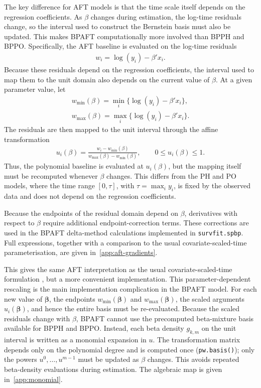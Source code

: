 \documentclass[5p,lefttitle]{elsarticle}
\begin{document}
{The key difference for AFT models is that the time scale itself depends on the regression coefficients. As \(\beta\) changes during estimation, the log-time residuals change, so the interval used to construct the Bernstein basis must also be updated. This makes BPAFT computationally more involved than BPPH and BPPO.
Specifically, the AFT baseline is evaluated on the log-time residuals
{\begin{align}
w_i = \log(y_i)-\beta'x_i .
\end{align}\normalsize}
Because these residuals depend on the regression coefficients, the interval
used to map them to the unit domain also depends on the current value of
\(\beta\). At a given parameter value, let
{\begin{align}
w_{\min}(\beta)=\min_i\{\log(y_i)-\beta'x_i\},\nonumber
\\
w_{\max}(\beta)=\max_i\{\log(y_i)-\beta'x_i\}.
\end{align}\normalsize}
The residuals are then mapped to the unit interval through the affine
transformation
{\begin{align}
u_i(\beta)
=
\frac{w_i-w_{\min}(\beta)}
     {w_{\max}(\beta)-w_{\min}(\beta)} ,
\qquad 0\leq u_i(\beta)\leq 1 .
\end{align}\normalsize}
Thus, the polynomial baseline is evaluated at \(u_i(\beta)\), but the
mapping itself must be recomputed whenever \(\beta\) changes. This differs
from the PH and PO models, where the time range \([0,\tau]\), with
\(\tau=\max_i y_i\), is fixed by the observed data and does not depend on the
regression coefficients.

Because the endpoints of the residual domain depend on \(\beta\),
derivatives with respect to \(\beta\) require additional
endpoint-correction terms. These corrections are used in the BPAFT
delta-method calculations implemented in \texttt{survfit.spbp}. Full
expressions, together with a comparison to the usual
covariate-scaled-time parameterisation, are given
in~\ref{app:aft-gradients}.

This gives the same AFT interpretation as the
usual covariate-scaled-time formulation \citep{kalbfleisch2002statistical},
but a more convenient implementation. This parameter-dependent rescaling is the main implementation complication in
the BPAFT model. For each new value of \(\boldsymbol{\beta}\), the
endpoints \(w_{\min}(\boldsymbol{\beta})\) and
\(w_{\max}(\boldsymbol{\beta})\), the scaled arguments
\(u_i(\boldsymbol{\beta})\), and hence the entire basis must be
re-evaluated. Because the scaled residuals change with \(\beta\), BPAFT cannot use the
precomputed beta-mixture basis available for BPPH and BPPO. Instead, each
beta density \(g_{k,m}\) on the unit interval is written as a monomial
expansion in \(u\). The transformation matrix depends only on the
polynomial degree and is computed once (\texttt{pw.basis()}); only the
powers \(u^{0},\ldots,u^{m-1}\) must be updated as \(\beta\) changes. This
avoids repeated beta-density evaluations during estimation. The algebraic
map is given in~\ref{app:monomial}.


}
\end{document}
